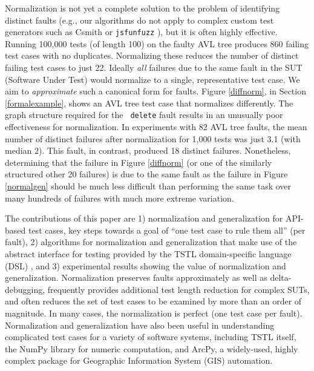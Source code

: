 Normalization is not yet a complete solution to the problem of identifying
distinct faults (e.g., our algorithms do not apply to complex custom
test generators such as Csmith \cite{csmith} or {\tt jsfunfuzz}
\cite{jsfunfuzz}), but it is often highly effective.  Running 100,000
tests (of length 100) on the faulty AVL tree produces 860 failing test
cases with no duplicates.  Normalizing these reduces the number of
distinct failing test cases to just 22.  Ideally \emph{all} failures
due to the same fault in the SUT (Software Under Test) would normalize
to a single, representative test case.  We aim to
\emph{approximate} such a canonical form for faults.  Figure \ref{diffnorm},
in Section \ref{formalexample}, shows an AVL tree test case that
normalizes differently.  The graph structure required for the {\tt
  delete} fault results in an
unusually poor effectiveness for normalization.  In experiments with 82 AVL tree faults,
the mean number of distinct failures after normalization for 1,000
tests was just 3.1 (with median 2). This fault, in contrast, produced 18
distinct failures.  Nonetheless, determining that the failure in Figure
\ref{diffnorm} (or one of the similarly structured other 20 failures)
is due to the same fault as the failure in Figure \ref{normalgen}
should be much less difficult than performing the same task over many hundreds of failures with much more extreme variation. 

The contributions of this paper are 1) normalization and
generalization for API-based test cases, key steps towards a goal of
``one test case to rule them all'' (per fault), 2) algorithms for
normalization and generalization that make use of the abstract
interface for testing provided by the TSTL \cite{tstl,NFM15,ISSTA15}
domain-specific language (DSL) \cite{Fow10}, and 3)
experimental results showing the value of normalization and
generalization.  Normalization preserves faults approximately
as well as delta-debugging, frequently provides additional test length
reduction for complex SUTs, and often reduces
the set of test cases to be examined by more than an order of
magnitude. In many cases, the normalization is perfect (one test case
per fault).  Normalization and generalization have also been useful in
understanding complicated test cases for a variety of software
systems, including TSTL itself, the NumPy library for numeric
computation, and ArcPy, a widely-used, highly complex package for
Geographic Information System (GIS) automation.

